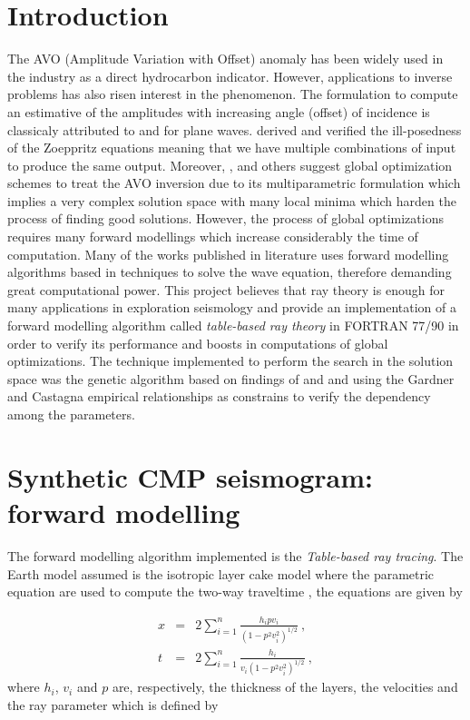 \documentclass{vie16}
\begin{document}
\section{Introduction}
The AVO (Amplitude Variation with Offset) anomaly has been widely used in the industry as a direct hydrocarbon indicator. However, applications to inverse problems has also risen interest in the phenomenon. The formulation to compute an estimative of the amplitudes with increasing angle (offset) of incidence is classicaly attributed to \cite{Zoeppritz1919} and \cite{Knott1899} for plane waves. \cite{Rosa1976} derived and verified the ill-posedness of the Zoeppritz equations meaning that we have multiple  combinations of input to produce the same output.  Moreover, \cite{Stoffa1991}, \cite{Mallick1995} and others suggest global optimization schemes to treat the AVO inversion due to its multiparametric formulation which implies a very complex solution space with many local minima which harden the process of finding good solutions. However, the process of global optimizations requires many forward modellings which increase considerably the time of computation. Many of the works published in literature uses forward modelling algorithms based in techniques to solve the wave equation, therefore demanding great computational power. This project believes that ray theory is enough for many applications in exploration seismology and provide an implementation of a forward modelling algorithm called \textit{table-based ray theory} in FORTRAN 77/90 in order to verify its performance and boosts in computations of global optimizations. The technique implemented to perform the search in the solution space was the genetic algorithm based on findings of \cite{Stoffa1991} and \cite{Sen1992} and using the Gardner and Castagna empirical relationships as constrains to verify the dependency among the parameters.

\section{Synthetic CMP seismogram: forward modelling}
The forward modelling algorithm implemented is the \textit{Table-based ray tracing}. The Earth model assumed is the isotropic layer cake model where the parametric equation are used to compute the two-way traveltime \cite{Slotnick}, the equations are given by

\begin{eqnarray}
x & = & 2\sum_{i=1}^{n} \frac {h_{i}pv_{i}} {(1 -
p^{2}v_{i}^{2})^{1/2}} \ ,\label{eq.x} \\
t & = & 2\sum_{i=1}^{n} \frac {h_{i}} {v_{i}(1 - p^{2}v_{i}^{2})^{1/2}} \ , \label{eq.t}
\end{eqnarray}
%
where $h_{i}$, $v_{i}$ and $p$ are, respectively, the thickness of the layers, the velocities and the ray parameter which is defined by 
\end{document}
